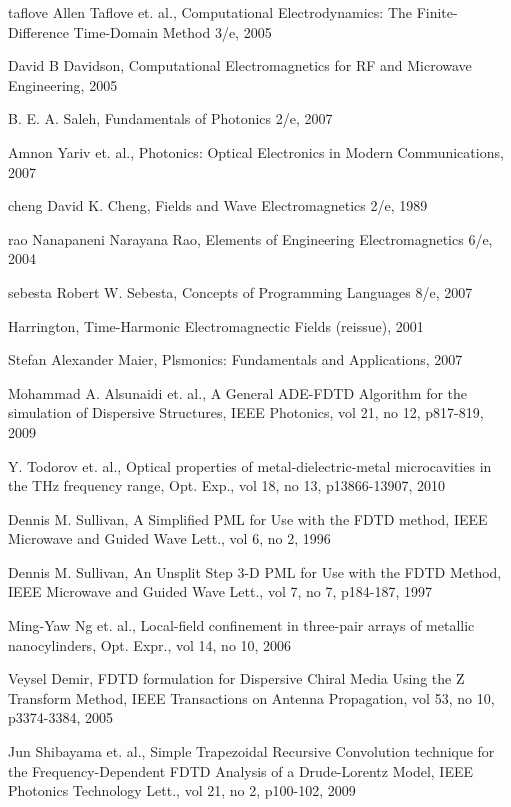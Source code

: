 \cleardoublepage
{}
\begin{thebibliography}{999}
  \bibitem
  {taflove}
  Allen Taflove et. al., Computational Electrodynamics: The Finite-Difference Time-Domain Method 3/e, 2005
 
  \bibitem
  {}
  David B Davidson, Computational Electromagnetics for RF and Microwave Engineering, 2005

  \bibitem
  {}
  B. E. A. Saleh, Fundamentals of Photonics 2/e, 2007

  \bibitem
  {}
  Amnon Yariv et. al., Photonics: Optical Electronics in Modern Communications, 2007

  \bibitem
  {cheng}
  David K. Cheng, Fields and Wave Electromagnetics 2/e, 1989

  \bibitem
  {rao} 
  Nanapaneni Narayana Rao, Elements of Engineering Electromagnetics 6/e, 2004

  \bibitem
  {sebesta}
  Robert W. Sebesta, Concepts of Programming Languages 8/e, 2007

  \bibitem
  {}
  Harrington, Time-Harmonic Electromagnectic Fields (reissue), 2001

  \bibitem
  {}
  Stefan Alexander Maier, Plsmonics: Fundamentals and Applications, 2007

  \bibitem
  {}
  Mohammad A. Alsunaidi et. al., A General ADE-FDTD Algorithm for the simulation of Dispersive Structures, IEEE Photonics, vol 21, no 12, p817-819, 2009

  \bibitem
  {}
  Y. Todorov et. al., Optical properties of metal-dielectric-metal microcavities in the THz frequency range, Opt. Exp., vol 18, no 13, p13866-13907, 2010

  \bibitem
  {}
  Dennis M. Sullivan, A Simplified PML for Use with the FDTD method, IEEE Microwave and Guided Wave Lett., vol 6, no 2, 1996

  \bibitem
  {}
  Dennis M. Sullivan, An Unsplit Step 3-D PML for Use with the FDTD Method, IEEE Microwave and Guided Wave Lett., vol 7, no 7, p184-187, 1997

  \bibitem
  {}
  Ming-Yaw Ng et. al., Local-field confinement in three-pair arrays of metallic nanocylinders, Opt. Expr., vol 14, no 10, 2006

  \bibitem
  {}
  Veysel Demir, FDTD formulation for Dispersive Chiral Media Using the Z Transform Method, IEEE Transactions on Antenna Propagation, vol 53, no 10, p3374-3384, 2005

  \bibitem
  {}  
  Jun Shibayama et. al., Simple Trapezoidal Recursive Convolution technique for the Frequency-Dependent FDTD Analysis of a Drude-Lorentz Model, IEEE Photonics Technology Lett., vol 21, no 2, p100-102, 2009
  
  

\end{thebibliography}
